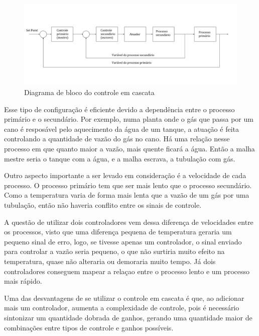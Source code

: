 \documentclass[a4paper,12pt]{article}
\begin{document}
\begin{figure}[h]
\centering
\includegraphics[width=17cm]{ImagensLab4/controle-em-cascata.png}
\caption{Diagrama de bloco do controle em cascata}
\label{cascata}
\end{figure}

Esse tipo de configuração é eficiente devido a dependência entre o processo primário e o secundário. Por exemplo, numa planta onde o gás que passa por um cano é resposável pelo aquecimento da água de um tanque, a atuação é feita controlando a quantidade de vazão do gás no cano. Há uma relação nesse processo em que quanto maior a vazão, mais quente ficará a água. Então a malha mestre seria o tanque com a água, e a malha escrava, a tubulação com gás. 

Outro aspecto importante a ser levado em consideração é a velocidade de cada processo. O processo primário tem que ser mais lento que o processo secundário. Como a temperatura varia de forma mais lenta que a vazão de um gás por uma tubulação, então não haveria conflito entre os sinais de controle. 

A questão de utilizar dois controladores vem dessa diferença de velocidades entre os processos, visto que uma diferença pequena de temperatura geraria um pequeno sinal de erro, logo, se tivesse apenas um controlador, o sinal enviado para controlar a vazão seria pequeno, o que não surtiria muito efeito na temperatura, quase não alteraria ou demoraria muito tempo. Já dois controladores conseguem mapear a relaçao entre o processo lento e um processo mais rápido. 

Uma das desvantagens de se utilizar o controle em cascata é que, ao adicionar mais um controlador, aumenta a complexidade de controle, pois é necessário sintonizar um quantidade dobrada de ganhos, gerando uma quantidade maior de combinações entre tipos de controle e ganhos possíveis. 




\newpage

\end{document}
